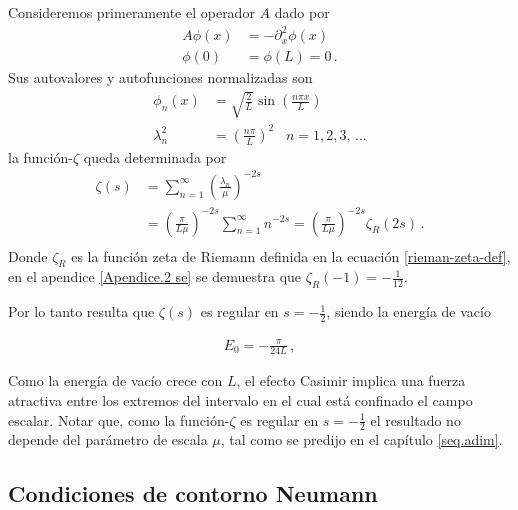 Consideremos primeramente el operador $A$ dado por
\begin{equation}
\begin{aligned}
	A \phi (x) &= - \partial _x ^2 \phi (x) \\[10pt]
    \phi (0) &= \phi(L) = 0 
    \, .
\end{aligned}
\end{equation}
Sus autovalores y autofunciones normalizadas son
\begin{equation}
\begin{aligned}
	\phi _n (x) &= \sqrt{\frac{2}{L}} \sin \left( \frac{n \pi x}{L} \right) \\[10pt]
	\lambda ^2 _n  &= \left( \frac{n \pi }{L} \right) ^2 \, \, \, \, \, n = 1,2,3, \, ...
\end{aligned}
\end{equation}
la  función-$\zeta$ queda determinada por
\begin{equation}
\begin{aligned}
\zeta  (s) &= 
\sum _{n=1} ^{\infty} \left( \frac{\lambda _n }{\mu }  \right) ^{-2s}  \\[10pt]
&= \left(  \frac{\pi}{L \mu} \right) ^{-2s}   \sum _{n=1} ^{\infty} n ^{-2s} = 
\left( \frac{\pi}{L \mu} \right) ^{-2s}  \zeta _R (2s) \, . \\[10pt]
\end{aligned}
\end{equation}
Donde $\zeta _R$ es la función zeta de Riemann definida en la ecuación \ref{rieman-zeta-def}, en el apendice \ref{Apendice.2 se} se demuestra  que $\zeta _R (-1) = - \frac{1}{12}$. 

Por lo tanto resulta que $\zeta (s)$ es regular en $s=-\frac{1}{2}$, siendo la energía de vacío

\begin{equation}\label{eq.energia.dirichlet}
\begin{array}{c}
E _0 = - \frac{\pi}{24 L} \, ,
\end{array}
\end{equation}


Como la energía de vacío crece con $L$, el efecto Casimir implica una fuerza
atractiva entre los extremos del intervalo en el cual está confinado el campo
escalar. Notar que, como la  función-$\zeta$ es regular en $s=-\frac{1}{2}$ el resultado no depende del parámetro de escala $\mu$, tal como se predijo en el capítulo \ref{seq.adim}.\\

\subsection*{Condiciones de contorno Neumann}


